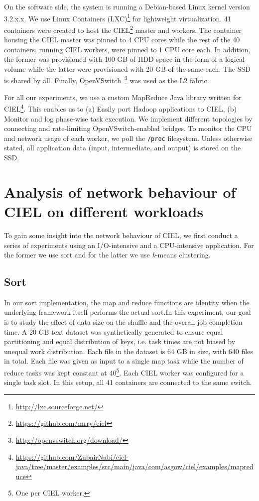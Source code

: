 \documentclass[a4paper,12pt,twoside,openright]{report}
\begin{document}
On the software side, the system is running a Debian-based Linux kernel version
3.2.x.x. We use Linux Containers
(LXC)\footnote{\url{http://lxc.sourceforge.net/}} for lightweight
virtualization. 41 containers were created to host the
CIEL\footnote{\url{https://github.com/mrry/ciel}} master and workers. The
container housing the CIEL master was pinned to 4 CPU cores while the rest of
the 40 containers, running CIEL workers, were pinned to 1 CPU core each. In
addition, the former was provisioned with 100 GB of HDD space in the form of a
logical volume while the latter were provisioned with 20 GB of the same each.
The SSD is shared by all. Finally,
OpenVSwitch~\cite{Pfaff:2009:ENI}\footnote{\url{http://openvswitch.org/download/}}
was used as the L2 fabric.

For all our experiments, we use a custom MapReduce Java library written for
CIEL\footnote{\url{https://github.com/ZubairNabi/ciel-java/tree/master/examples/src/main/java/com/asgow/ciel/examples/mapreduce}}.
This enables us to (a) Easily port Hadoop applications to CIEL, (b) Monitor and
log phase-wise task execution. We implement different topologies by connecting
and rate-limiting OpenVSwitch-enabled bridges. To monitor the CPU and network
usage of each worker, we poll the \texttt{/proc} filesystem. Unless otherwise
stated, all application data (input, intermediate, and output) is stored on the
SSD.

\section{Analysis of network behaviour of CIEL on different workloads}
To gain some insight into the network behaviour of CIEL, we first conduct a
series of experiments using an I/O-intensive and a CPU-intensive application.
For the former we use sort and for the latter we use \emph{k}-means clustering.

\subsection{Sort}
In our sort implementation, the map and reduce functions are identity when the
underlying framework itself performs the actual sort.In this experiment, our
goal is to study the effect of data size on the shuffle and the overall job
completion time. A 20 GB text dataset was synthetically generated to ensure
equal partitioning and equal distribution of keys, i.e. task times are not
biased by unequal work distribution. Each file in the dataset is 64 GB in size,
with 640 files in total. Each file was given as input to a single map task while
the number of reduce tasks was kept constant at 40\footnote{One per CIEL
worker.}. Each CIEL worker was configured for a single task slot. In this setup,
all 41 containers are connected to the same switch.
\end{document}
